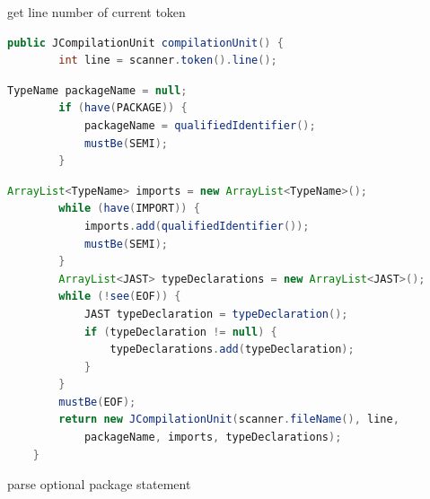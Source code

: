 \documentclass[8pt,a4paper,compress]{beamer}
\begin{document}
\begin{frame}[fragile]
\begin{overprint}
\begin{tcolorbox}[enhanced,drop shadow southwest,sharp corners,size=fbox,colback=white,fontlower=\small\ttfamily,collower=silver900]
\tcblower
\begin{minipage}[t][.2cm][t]{\textwidth}
get line number of current token
\end{minipage}
\end{tcolorbox}

\begin{tcolorbox}[enhanced,drop shadow southwest,sharp corners,size=fbox,colback=white,fontlower=\small\ttfamily,collower=silver900]

\begin{lstlisting}[language=Java,style=focusout]
    public JCompilationUnit compilationUnit() {
        int line = scanner.token().line();
\end{lstlisting}
\begin{lstlisting}[language=Java,style=focusin,backgroundcolor=\color{lime100}]
        TypeName packageName = null;
        if (have(PACKAGE)) {
            packageName = qualifiedIdentifier();
            mustBe(SEMI);
        }
\end{lstlisting}
\begin{lstlisting}[language=Java,style=focusout]
        ArrayList<TypeName> imports = new ArrayList<TypeName>();
        while (have(IMPORT)) {
            imports.add(qualifiedIdentifier());
            mustBe(SEMI);
        }
        ArrayList<JAST> typeDeclarations = new ArrayList<JAST>();
        while (!see(EOF)) {
            JAST typeDeclaration = typeDeclaration();
            if (typeDeclaration != null) {
                typeDeclarations.add(typeDeclaration);
            }
        }
        mustBe(EOF);
        return new JCompilationUnit(scanner.fileName(), line, 
            packageName, imports, typeDeclarations);
    }
\end{lstlisting}

\tcblower
\begin{minipage}[t][.2cm][t]{\textwidth}
parse optional package statement
\end{minipage}
\end{tcolorbox}

\begin{tcolorbox}[enhanced,drop shadow southwest,sharp corners,size=fbox,colback=white,fontlower=\small\ttfamily,collower=silver900]


\end{tcolorbox}
\end{overprint}
\end{frame}
\end{document}
